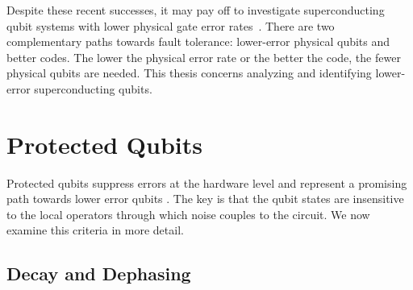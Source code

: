 Despite these recent successes, it may pay off to investigate superconducting qubit systems with lower physical gate error rates~\cite{eisert2025}.
There are two complementary paths towards fault tolerance: lower-error physical qubits and better codes.
The lower the physical error rate or the better the code, the fewer physical qubits are needed.
This thesis concerns analyzing and identifying lower-error superconducting qubits.




\section{Protected Qubits}\label{sec:protected_qubits}

Protected qubits suppress errors at the hardware level and represent a promising path towards lower error qubits \cite{gyenisMovingTransmonNoiseProtected2021b}.
The key is that the qubit states are insensitive to the local operators through which noise couples to the circuit.
We now examine this criteria in more detail.

\subsection{Decay and Dephasing}
\label{sec:estimating_lifetimes}

